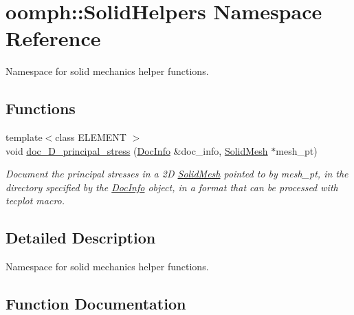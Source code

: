 \hypertarget{namespaceoomph_1_1SolidHelpers}{}\section{oomph\+:\+:Solid\+Helpers Namespace Reference}
\label{namespaceoomph_1_1SolidHelpers}


Namespace for solid mechanics helper functions.  


\subsection*{Functions}
\begin{DoxyCompactItemize}
\item 
{\footnotesize template$<$class E\+L\+E\+M\+E\+NT $>$ }\\void \hyperlink{namespaceoomph_1_1SolidHelpers_a3d907f48fd1b520813a79785442a3e1a}{doc\+\_\+D\+\_\+principal\+\_\+stress} (\hyperlink{classoomph_1_1DocInfo}{Doc\+Info} \&doc\+\_\+info, \hyperlink{classoomph_1_1SolidMesh}{Solid\+Mesh} $\ast$mesh\+\_\+pt)
\begin{DoxyCompactList}\small\item\em Document the principal stresses in a 2D \hyperlink{classoomph_1_1SolidMesh}{Solid\+Mesh} pointed to by {\ttfamily mesh\+\_\+pt}, in the directory specified by the \hyperlink{classoomph_1_1DocInfo}{Doc\+Info} object, in a format that can be processed with tecplot macro. \end{DoxyCompactList}\end{DoxyCompactItemize}


\subsection{Detailed Description}
Namespace for solid mechanics helper functions. 

\subsection{Function Documentation}
\mbox{\label{namespaceoomph_1_1SolidHelpers_a3d907f48fd1b520813a79785442a3e1a}} 
